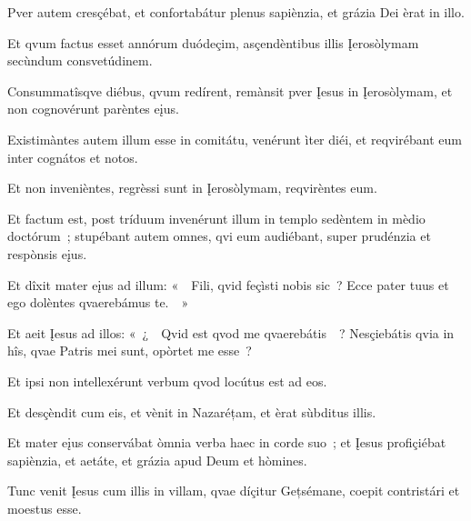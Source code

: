 Pver autem cresçébat, et confortabátur plenus sapiènzia, et grázia Dei èrat in illo. 


Et qvum factus esset annórum duódeçim, asçendèntibus illis Įerosòlymam secùndum consvetúdinem. 

Consummatîsqve diébus, qvum redírent, remànsit pver Įesus in Įerosòlymam, et non cognovérunt parèntes eįus. 

Existimàntes autem illum esse in comitátu, venérunt ìter diéi, et reqvirébant eum inter cognátos et notos. 

Et non invenièntes, regrèssi sunt in Įerosòlymam, reqvirèntes eum. 

Et factum est, post tríduum invenérunt illum in templo sedèntem in mèdio doctórum~; stupébant autem omnes, qvi eum audiébant, super prudénzia et respònsis eįus. 

Et dîxit mater eįus ad illum: «~~Fili, qvid feçìsti nobis sic~? Ecce pater tuus et ego dolèntes qvaerebámus te.~~» 

Et aeit Įesus ad illos: «~¿~~Qvid est qvod me qvaerebátis~~? Nesçiebátis qvia in hîs, qvae Patris mei sunt, opòrtet me esse~? 

Et ipsi non intellexérunt verbum qvod locútus est ad eos. 

Et desçèndit cum eis, et vènit in Nazaréțam, et èrat sùbditus illis. 

Et mater eįus conservábat òmnia verba haec in corde suo~; et Įesus profiçiébat sapiènzia, et aetáte, et grázia apud Deum et hòmines. 


Tunc venit Įesus cum illis in villam, qvae díçitur Gețsémane, coepit contristári et moestus esse. 

